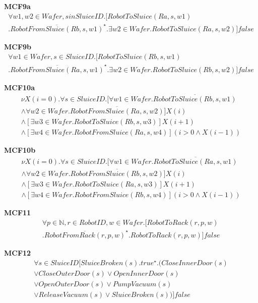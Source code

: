 \documentclass[12pt]{report}
\begin{document}
    \textbf{MCF9a}
    \begin{multline*}
        [true^{\star}] \forall w1,w2 \in Wafer, s in SluiceID.[RobotToSluice(Ra,s,w1) \\
        .\overline{RobotFromSluice(Rb,s,w1)}^{\star}. \exists w2 \in Wafer. RobotToSluice(Ra,s,w2)]false
    \end{multline*}

    \textbf{MCF9b}
    \begin{multline*}
        [true^{\star}] \forall w1 \in Wafer, s \in SluiceID.[RobotToSluice(Rb,s,w1)\\
        .\overline{RobotFromSluice(Ra,s,w1)}^{\star}. \exists w2 \in Wafer. RobotToSluice(Rb,s,w2)]false
    \end{multline*}

    \textbf{MCF10a}
    \begin{multline*}
        \nu X(i=0). \forall s \in SluiceID. [\forall w1 \in Wafer. \overline{RobotToSluice(Rb,s,w1)} \\
        \wedge \forall w2 \in Wafer. \overline{RobotFromSluice(Ra,s,w2)}] X(i) \\
        \wedge [\exists w3 \in Wafer. RobotToSluice(Rb,s,w3)]X(i+1) \\
        \wedge [\exists w4 \in Wafer.RobotFromSluice(Ra,s,w4)](i>0 \wedge X(i-1))
    \end{multline*}

    \textbf{MCF10b}
    \begin{multline*}
        \nu X(i=0). \forall s \in SluiceID. [\forall w1 \in Wafer. \overline{RobotToSluice(Ra,s,w1)} \\
        \wedge \forall w2 \in Wafer. \overline{RobotFromSluice(Rb,s,w2)}] X(i) \\
        \wedge [\exists w3 \in Wafer. RobotToSluice(Ra,s,w3)]X(i+1) \\
        \wedge [\exists w4 \in Wafer.RobotFromSluice(Rb,s,w4)](i>0 \wedge X(i-1))
    \end{multline*}

    \textbf{MCF11}
    \begin{multline*}
        [true^{\star}] \forall p \in \mathbb{N}, r \in RobotID, w \in Wafer. [RobotToRack(r,p,w)\\
        .\overline{RobotFromRack(r,p,w)}^\star.RobotToRack(r,p,w)]false
    \end{multline*}

    \textbf{MCF12}
    \begin{multline*}
        [true^{\star}] \forall s \in SluiceID [SluiceBroken(s).true^{\star}.(CloseInnerDoor(s) \\
        \vee CloseOuterDoor(s) \vee OpenInnerDoor(s) \\
        \vee OpenOuterDoor(s) \vee PumpVacuum(s) \\
        \vee ReleaseVacuum(s) \vee SluiceBroken(s))]false
    \end{multline*}
\end{document}
